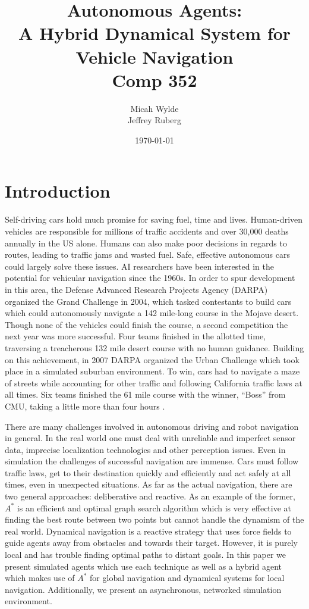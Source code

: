 \documentclass{article}
\author{Micah Wylde\\Jeffrey Ruberg}
\date{\today}
\title{Autonomous Agents:\\
A Hybrid Dynamical System for Vehicle Navigation\\
Comp 352}
\begin{document}
\maketitle

\section{Introduction}
Self-driving cars hold much promise for saving fuel, time and
lives. Human-driven vehicles are responsible for millions of traffic
accidents and over 30,000 deaths annually in the US alone. Humans can
also make poor decisions in regards to routes, leading to traffic jams
and wasted fuel. Safe, effective autonomous cars could largely solve
these issues. AI researchers have been interested in the potential for
vehicular navigation since the 1960s. In order to spur development in
this area, the Defense Advanced Research Projects Agency (DARPA)
organized the Grand Challenge in 2004, which tasked contestants to
build cars which could autonomously navigate a 142 mile-long course in
the Mojave desert. Though none of the vehicles could finish the
course, a second competition the next year was more successful. Four
teams finished in the allotted time, traversing a treacherous 132 mile
desert course with no human guidance. Building on this achievement, in
2007 DARPA organized the Urban Challenge which took place in a
simulated suburban environment. To win, cars had to navigate a maze of
streets while accounting for other traffic and following California
traffic laws at all times. Six teams finished the 61 mile course with
the winner, ``Boss'' from CMU, taking a little more than four hours
\cite{robotic_cars}.

There are many challenges involved in autonomous driving and robot
navigation in general. In the real world one must deal with unreliable
and imperfect sensor data, imprecise localization technologies and
other perception issues. Even in simulation the challenges of
successful navigation are immense. Cars must follow traffic laws, get
to their destination quickly and efficiently and act safely at all
times, even in unexpected situations. As far as the actual navigation,
there are two general approaches: deliberative and reactive. As an
example of the former, $A^*$ is an efficient and optimal graph search
algorithm which is very effective at finding the best route between
two points but cannot handle the dynamism of the real world. Dynamical
navigation is a reactive strategy that uses force fields to guide
agents away from obstacles and towards their target. However, it is
purely local and has trouble finding optimal paths to distant
goals. In this paper we present simulated agents which use each
technique as well as a hybrid agent which makes use of $A^*$ for global
navigation and dynamical systems for local navigation. Additionally,
we present an asynchronous, networked simulation environment.
\end{document}
